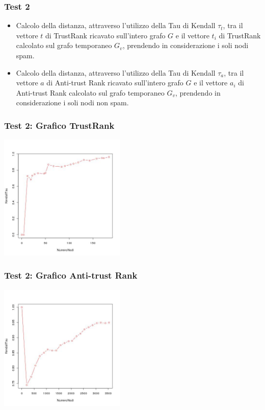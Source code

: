 \documentclass{beamer}
\begin{document}
\begin{frame}
\frametitle{Test 2}
  \begin{itemize}
   \item<1-> Calcolo della distanza, attraverso l’utilizzo della Tau di Kendall \(\tau_t\), tra il vettore \(t\) di TrustRank ricavato sull’intero grafo \(G\) e il vettore \(t_i\) di TrustRank calcolato sul grafo temporaneo \(G_v\), prendendo in considerazione i soli nodi spam.
   \item<2-> Calcolo della distanza, attraverso l’utilizzo della Tau di Kendall \(\tau_a\), tra il vettore \(a\) di Anti-trust Rank ricavato sull’intero grafo \(G\) e il vettore \(a_i\) di Anti-trust Rank calcolato sul grafo temporaneo \(G_v\), prendendo in considerazione i soli nodi non spam.
  \end{itemize}
  \end{frame}
  \begin{frame}
\frametitle{Test 2: Grafico TrustRank}
\begin{center}
 \includegraphics[height=6cm]{immagini/test2/trustrankBadNodesTestMode1_62}
\end{center}
\end{frame}
  \begin{frame}
\frametitle{Test 2: Grafico Anti-trust Rank}
\begin{center}
 \includegraphics[height=6cm]{immagini/test2/antiTrustraktGoodNodesTestMode1_62}
\end{center}
\end{frame}
\end{document}
